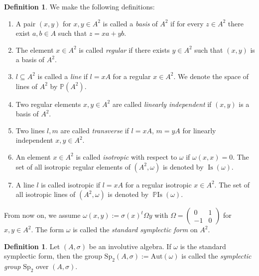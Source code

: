 \documentclass[a4paper,oneside,11pt]{amsart}
\DeclareMathOperator{\Is}{Is}
\DeclareMathOperator{\PIs}{\mathbb{P}Is}
\newcommand{\PP}{\mathbb P}
\theoremstyle{plain}
\theoremstyle{definition}
\newtheorem{df}[teo]{Definition}
\theoremstyle{remark}
\newcommand{\defin}{\emph}
\begin{document}
\begin{df}
We make the following definitions:
\begin{enumerate}
\item A pair $(x,y)$ for $x,y\in A^2$ is called a \defin{basis} of $A^2$ if for every $z\in A^2$ there exist $a,b\in A$ such that $z=xa+yb$.
\item The element $x\in A^2$ is called \defin{regular} if there exists $y\in A^2$ such that $(x,y)$ is a basis of $A^2$.
\item $l\subseteq A^2$ is called a \defin{line} if $l=xA$ for a regular $x\in A^2$. We denote the space of lines of $A^2$ by $\PP(A^2)$.
\item Two regular elements $x,y\in A^2$ are called \defin{linearly independent}
if $(x,y)$ is a basis of $A^2$.
\item Two lines $l,m$ are called \defin{transverse} if $l=xA$, $m=yA$ for linearly independent $x,y\in A^2$.
\item An element $x\in A^2$ is called \defin{isotropic} with respect to $\omega$ if $\omega(x,x)=0$. The set of all isotropic regular elements of $(A^2,\omega)$ is denoted by $\Is(\omega)$.
\item A line $l$ is called isotropic if $l=xA$ for a regular isotropic $x\in A^2$. The set of all isotropic lines of $(A^2,\omega)$ is denoted by $\PIs(\omega)$.
\end{enumerate}
\end{df}

From now on, we assume $\omega(x,y):=\sigma(x)^t\Omega y$ with $\Omega=\begin{pmatrix}0 & 1 \\ -1 & 0\end{pmatrix}$ for $x,y\in A^2$. The form $\omega$ is called the \emph{standard symplectic form} on $A^2$.

\begin{df}
Let $(A,\sigma)$ be an involutive algebra. If $\omega$ is the standard symplectic form, then the group $\mathrm{Sp}_2(A,\sigma):=\mathrm{Aut}(\omega)$ is called the \emph{symplectic group} $\mathrm{Sp}_2$ over $(A,\sigma)$.
\end{df}
\end{document}
